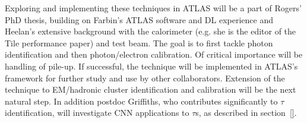
Exploring and implementing these techniques in ATLAS will be a part of
Rogers' PhD thesis, building on Farbin's ATLAS software and DL
experience and Heelan's extensive background with the calorimeter
(e.g. she is the editor of the Tile performance paper) and test
beam. The goal is to first tackle photon identification and then
photon/electron calibration. Of critical importance will be handling
of pile-up. If successful, the technique will be implemented in
ATLAS's framework for further study and use by other
collaborators. Extension of the technique to EM/hadronic cluster
identification and calibration will be the next natural step. In
addition postdoc Griffiths, who contributes significantly to $\tau$
identification, will investigate CNN applications to $\tau$s, as
described in section~\ref{}.








